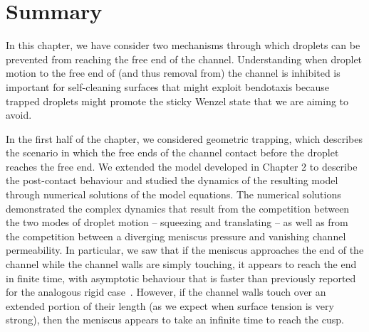 \section{Summary}
In this chapter, we have consider two mechanisms through which droplets can be prevented from reaching the free end of the channel. Understanding when droplet motion to the free end of (and thus removal from) the channel is inhibited is important for self-cleaning surfaces that might exploit bendotaxis because trapped droplets might promote the sticky Wenzel state that we are aiming to avoid.

In the first half of the chapter, we considered geometric trapping, which describes the scenario in which the free ends of the channel contact before the droplet reaches the free end. We extended the model developed in Chapter 2 to describe the post-contact behaviour and studied the dynamics of the resulting model through numerical solutions of the model equations. The numerical solutions demonstrated the complex dynamics that result from the competition between the two modes of droplet motion -- squeezing and translating -- as well as from the competition between a diverging meniscus pressure and vanishing channel permeability. In particular, we saw that if the meniscus approaches the end of the channel while the channel walls are simply touching, it appears to reach the end in finite time, with asymptotic behaviour that is faster than previously reported for the analogous rigid case~\citep{Gorce2016Langmuir}. However, if the channel walls touch over an extended portion of their length (as we expect when surface tension is very strong), then the meniscus appears to take an infinite time to reach the cusp.

